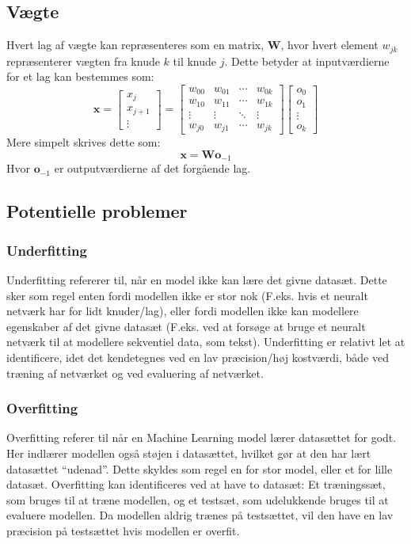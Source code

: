\documentclass[../SOP.tex]{subfile}
\begin{document}
\subsection{Vægte}
Hvert lag af vægte kan repræsenteres som en matrix, $\mathbf{W}$, hvor hvert element $w_{jk}$ repræsenterer vægten fra knude $k$ til knude $j$. Dette betyder at inputværdierne for et lag kan bestemmes som:
\begin{equation}
  \mathbf{x}=\begin{bmatrix}
    x_j \\ x_{j+1} \\ \vdots
  \end{bmatrix}
  =
  \begin{bmatrix}
    w_{00} & w_{01} & \cdots & w_{0k} \\
    w_{10} & w_{11} & \cdots & w_{1k} \\
    \vdots & \vdots & \ddots & \vdots \\
    w_{j0} & w_{j1} & \cdots & w_{jk}
  \end{bmatrix}
  \begin{bmatrix}
    o_0 \\ o_1 \\ \vdots \\ o_k
  \end{bmatrix}
  \label{eq:inputEx}
\end{equation}
Mere simpelt skrives dette som:
\begin{equation}
  \mathbf{x}=\mathbf{W}\mathbf{o}_{-1}
  \label{eq:inputSimp}
\end{equation}
Hvor $\mathbf{o}_{-1}$ er outputværdierne af det forgående lag.

\subsection{Potentielle problemer}
\subsubsection{Underfitting}
Underfitting refererer til, når en model ikke kan lære det givne datasæt. Dette sker som regel enten fordi modellen ikke er stor nok (F.eks. hvis et neuralt netværk har for lidt knuder/lag), eller fordi modellen ikke kan modellere egenskaber af det givne datasæt (F.eks. ved at forsøge at bruge et neuralt netværk til at modellere sekventiel data, som tekst). Underfitting er relativt let at identificere, idet det kendetegnes ved en lav præcision/høj kostværdi, både ved træning af netværket og ved evaluering af netværket. \parencite{overfit}
\subsubsection{Overfitting}
Overfitting referer til når en Machine Learning model lærer datasættet for godt. Her indlærer modellen også støjen i datasættet, hvilket gør at den har lært datasættet ``udenad''. Dette skyldes som regel en for stor model, eller et for lille datasæt. Overfitting kan identificeres ved at have to datasæt: Et træningssæt, som bruges til at træne modellen, og et testsæt, som udelukkende bruges til at evaluere modellen. Da modellen aldrig trænes på testsættet, vil den have en lav præcision på testsættet hvis modellen er overfit. \parencite{overfit}
\end{document}
